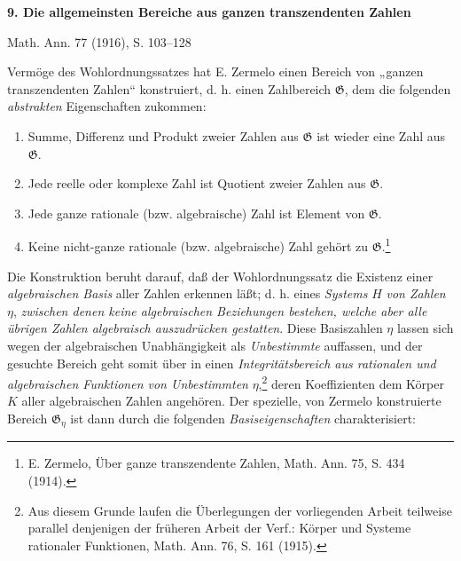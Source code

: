 \documentclass[11pt]{article}
\begin{document}
\clearpage

\begin{center}
{\Large\bfseries 9. Die allgemeinsten Bereiche aus ganzen transzendenten Zahlen}\par
\vspace{1.2em}
Math. Ann. 77 (1916), S. 103--128
\end{center}

Vermöge des Wohlordnungssatzes hat E. Zermelo einen Bereich von
„ganzen transzendenten Zahlen“ konstruiert, d. h. einen Zahlbereich
$\mathfrak G$, dem die folgenden \emph{abstrakten} Eigenschaften zukommen:
\begin{enumerate}
\item[I.] Summe, Differenz und Produkt zweier Zahlen aus $\mathfrak G$ ist wieder
eine Zahl aus $\mathfrak G$.
\item[II.] Jede reelle oder komplexe Zahl ist Quotient zweier Zahlen aus $\mathfrak G$.
\item[III.] Jede ganze rationale (bzw. algebraische) Zahl ist Element von $\mathfrak G$.
\item[IV.] Keine nicht-ganze rationale (bzw. algebraische) Zahl gehört zu
$\mathfrak G$.\footnote{E. Zermelo, Über ganze transzendente Zahlen,
Math. Ann. 75, S. 434 (1914).}
\end{enumerate}

Die Konstruktion beruht darauf, daß der Wohlordnungssatz die Existenz
einer \emph{algebraischen Basis} aller Zahlen erkennen läßt; d. h. eines
\emph{Systems} $H$ \emph{von Zahlen} $\eta$, \emph{zwischen denen keine
algebraischen Beziehungen bestehen, welche aber alle übrigen Zahlen algebraisch
auszudrücken gestatten}. Diese Basiszahlen $\eta$ lassen sich wegen der
algebraischen Unabhängigkeit als \emph{Unbestimmte} auffassen, und der gesuchte
Bereich geht somit über in einen \emph{Integritätsbereich aus rationalen und
algebraischen Funktionen von Unbestimmten} $\eta$,\footnote{Aus diesem Grunde
laufen die Überlegungen der vorliegenden Arbeit teilweise parallel denjenigen
der früheren Arbeit der Verf.: Körper und Systeme rationaler Funktionen,
Math. Ann. 76, S. 161 (1915).} deren Koeffizienten dem Körper $K$ aller
algebraischen Zahlen angehören. Der spezielle, von Zermelo konstruierte
Bereich $\mathfrak G_\eta$ ist dann durch die folgenden \emph{Basiseigenschaften}
charakterisiert:
\end{document}
